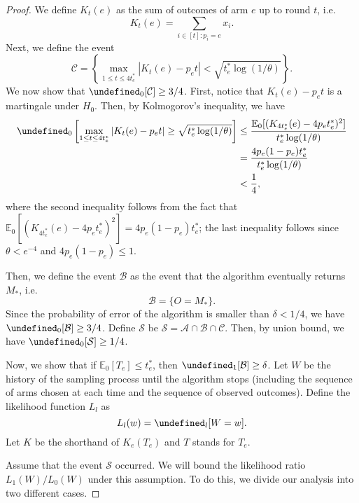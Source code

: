 \documentclass{article}
\newcommand{\E}{\mathbb E}
\let\Pr\undefined
\DeclareMathOperator{\Pr}{Pr}
\begin{document}
\begin{spacing}{1.1}
\begin{proof}
We define $K_t(e)$ as the sum of outcomes of arm $e$ up to round $t$, i.e. 
$$
K_t(e) = \sum_{i\in [t]: p_i=e} x_i. 
$$
Next, we define the event 
$$
\mathcal C=\left\{\max_{1\le t \le 4t_e^*} \left|K_t(e)-p_e t\right|  < \sqrt{t_e^*\log(1/\theta)} \right\}.
$$
We now show that $\Pr_0[\mathcal C] \ge 3/4$.
First, notice that $K_t(e)-p_e t$ is a martingale under $H_0$.
Then, by Kolmogorov's inequality, we have
\begin{align*}
\Pr_0\left[\max_{1\le t \le 4t_e^*} \left|K_t(e)-p_e t\right| \ge \sqrt{t_e^*\log(1/\theta)} \right]
&\le \frac{\E_0[ (K_{4t_e^*}(e)-4p_et_e^*)^2]}{t_e^*\log(1/\theta)}\\
&= \frac{4p_e(1-p_e)t_e^*}{t_e^*\log(1/\theta)}\\
&< \frac14,
\end{align*}
where the second inequality follows from the fact that $\E_0[(K_{4t_e^*}(e)-4p_et_e^*)^2] = 4p_e(1-p_e)t_e^*$; the last inequality follows 
since $\theta < e^{-4}$ and $4p_e(1-p_e) \le 1$.

Then, we define the event $\mathcal B$ as the event that the algorithm eventually returns $M_*$, i.e.
$$
\mathcal B=\{O=M_*\}.
$$
Since the probability of error of the algorithm is smaller than $\delta < 1/4$, we have $\Pr_0[\mathcal B] \ge 3/4$.
Define $\mathcal S$ be $\mathcal S=\mathcal A\cap \mathcal B \cap \mathcal C$. 
Then, by union bound, we have $\Pr_0[\mathcal S]\ge 1/4$.

Now, we show that if $\E_0[T_e] \le t_e^*$, then $\Pr_1[\mathcal B] \ge \delta$.
Let $W$ be the history of the sampling process until the algorithm stops (including the sequence of arms chosen at each time and the sequence of observed outcomes).
Define the likelihood function $L_l$ as 
$$
L_l(w) = \Pr_l[W=w].
$$
Let $K$ be the shorthand of $K_e(T_e)$ and $T$ stands for $T_e$.


Assume that the event $\mathcal S$ occurred.
We will bound the likelihood ratio $L_1(W)/L_0(W)$ under this assumption. 
To do this, we divide our analysis into two different cases.


\end{proof}
\end{spacing}
\end{document}
